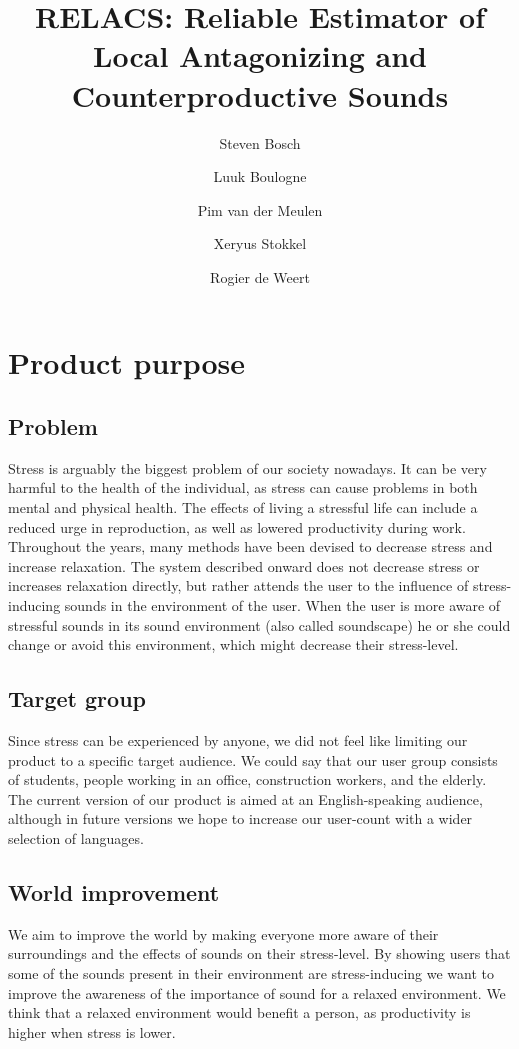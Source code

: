 \documentclass[a4paper]{article}
\title{{RELACS: Reliable Estimator of Local Antagonizing and Counterproductive Sounds}}
\author{Steven Bosch \and Luuk Boulogne \and Pim van der Meulen \and Xeryus Stokkel  \and Rogier de Weert}
\begin{document}
\maketitle

\section{Product purpose}

\subsection{Problem}
Stress is arguably the biggest problem of our society nowadays. It can be very harmful to the health of the individual, as stress can cause problems in both mental and physical health. The effects of living a stressful life can include a reduced urge in reproduction, as well as lowered productivity during work. Throughout the years, many methods have been devised to decrease stress and increase relaxation. The system described onward does not decrease stress or increases relaxation directly, but rather attends the user to the influence of stress-inducing sounds in the environment of the user. When the user is more aware of stressful sounds in its sound environment (also called soundscape) he or she could change or avoid this environment, which might decrease their stress-level.

\subsection{Target group}
Since stress can be experienced by anyone, we did not feel like limiting our product to a specific target audience. We could say that our user group consists of students, people working in an office, construction workers, and the elderly. 
The current version of our product is aimed at an English-speaking audience, although in future versions we hope to increase our user-count with a wider selection of languages. 

\subsection{World improvement}
We aim to improve the world by making everyone more aware of their surroundings and the effects of sounds on their stress-level. 
By showing users that some of the sounds present in their environment are stress-inducing we want to improve the awareness of the importance of sound for a relaxed environment. 
We think that a relaxed environment would benefit a person, as productivity is higher when stress is lower.
\end{document}

